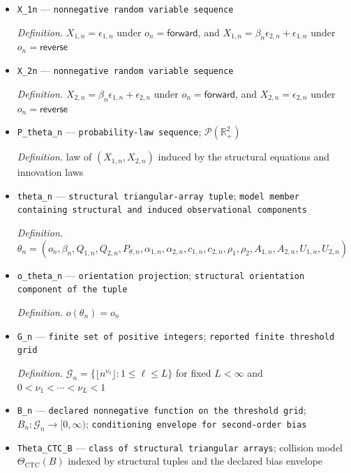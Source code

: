 \documentclass{article}
\begin{document}
\begin{itemize}
  \par\smallskip\noindent\emph{Definition.} \(c_{2,n}=U_{2,n}(t_n)^{\alpha_{2,n}}/t_n\)
  \item \texttt{X\_\allowbreak{}1n} --- \texttt{nonnegative random variable sequence}
  \par\smallskip\noindent\emph{Definition.} \(X_{1,n}=\epsilon_{1,n}\) under \(o_n=\mathsf{forward}\), and \(X_{1,n}=\beta_n\epsilon_{2,n}+\epsilon_{1,n}\) under \(o_n=\mathsf{reverse}\)
  \item \texttt{X\_\allowbreak{}2n} --- \texttt{nonnegative random variable sequence}
  \par\smallskip\noindent\emph{Definition.} \(X_{2,n}=\beta_n\epsilon_{1,n}+\epsilon_{2,n}\) under \(o_n=\mathsf{forward}\), and \(X_{2,n}=\epsilon_{2,n}\) under \(o_n=\mathsf{reverse}\)
  \item \texttt{P\_\allowbreak{}theta\_\allowbreak{}n} --- \texttt{probability-\allowbreak{}law sequence}; \(\mathcal P(\mathbb R_+^2)\)
  \par\smallskip\noindent\emph{Definition.} law of \((X_{1,n},X_{2,n})\) induced by the structural equations and innovation laws
  \item \texttt{theta\_\allowbreak{}n} --- \texttt{structural triangular-\allowbreak{}array tuple}; \texttt{model member containing structural and induced observational components}
  \par\smallskip\noindent\emph{Definition.} \(\theta_n=(o_n,\beta_n,Q_{1,n},Q_{2,n},P_{\theta,n},\alpha_{1,n},\alpha_{2,n},c_{1,n},c_{2,n},\rho_1,\rho_2,A_{1,n},A_{2,n},U_{1,n},U_{2,n})\)
  \item \texttt{o\_\allowbreak{}theta\_\allowbreak{}n} --- \texttt{orientation projection}; \texttt{structural orientation component of the tuple}
  \par\smallskip\noindent\emph{Definition.} \(o(\theta_n)=o_n\)
  \item \texttt{G\_\allowbreak{}n} --- \texttt{finite set of positive integers}; \texttt{reported finite threshold grid}
  \par\smallskip\noindent\emph{Definition.} \(\mathcal G_n=\{\lfloor n^{\nu_\ell}\rfloor:1\leq\ell\leq L\}\) for fixed \(L<\infty\) and \(0<\nu_1<\cdots<\nu_L<1\)
  \item \texttt{B\_\allowbreak{}n} --- \texttt{declared nonnegative function on the threshold grid}; \(B_n:\mathcal G_n\to[0,\infty)\); \texttt{conditioning envelope for second-\allowbreak{}order bias}
  \item \texttt{Theta\_\allowbreak{}CTC\_\allowbreak{}B} --- \texttt{class of structural triangular arrays}; collision model \(\Theta_{\mathrm{CTC}}(B)\) indexed by structural tuples and the declared bias envelope

\end{itemize}
\end{document}
